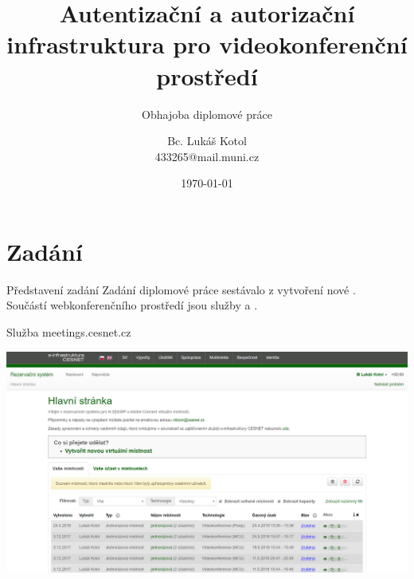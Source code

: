 \documentclass[
]{beamer}
\begin{document}
\title[Obhajoba diplomové práce]{Autentizační a autorizační infrastruktura pro videokonferenční prostředí}
\subtitle[Short Presentation Subtitle]{Obhajoba diplomové práce}
\author[L.\,Kotol]{Bc. Lukáš Kotol \\ 433265@mail.muni.cz}
\date{\today}
\subject{Presentation Subject}

\begin{frame}[plain]
\maketitle
\end{frame}

\section[Zadání]{Zadání}

\begin{frame}{Představení zadání}{}
Zadání diplomové práce sestávalo z vytvoření nové . 
\\
\medskip
Součástí webkonferenčního prostředí jsou služby
 a .

\end{frame}

\begin{frame}{Služba meetings.cesnet.cz}

\includegraphics[width=\textwidth]{pics/rezervacni_system}
\end{frame}
\end{document}
